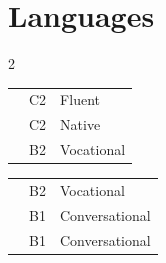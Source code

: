 \documentclass[a4paper,11pt]{article}
\begin{document}
\section{\textbf{Languages}}
\vspace{0.4mm}
\begin{center}
\begin{multicols}{2}
  \begin{tabularx}{6.6cm}{>{\raggedright\arraybackslash}X  >{\raggedright\arraybackslash}X  >{\raggedright\arraybackslash}X}
    {\bf English } & C2 & \hspace{-1.4cm}Fluent\vspace{0.4mm} \\
    {\bf Romanian} & C2 & \hspace{-1.4cm}Native\vspace{0.4mm} \\
    {\bf German  } & B2 & \hspace{-1.4cm}Vocational \\
  \end{tabularx}
  \begin{tabularx}{6.1cm}{>{\raggedright\arraybackslash}X  >{\raggedright\arraybackslash}X  >{\raggedright\arraybackslash}X}
    {\bf Japanese} & B2 & \hspace{-1.3cm}Vocational\vspace{0.4mm} \\
    {\bf Dutch } & B1 & \hspace{-1.3cm}Conversational\vspace{0.4mm} \\
    {\bf French  } & B1 & \hspace{-1.3cm}Conversational \\
  \end{tabularx}

\end{multicols}
\end{center}
  
\vspace{-5mm}
\end{document}
